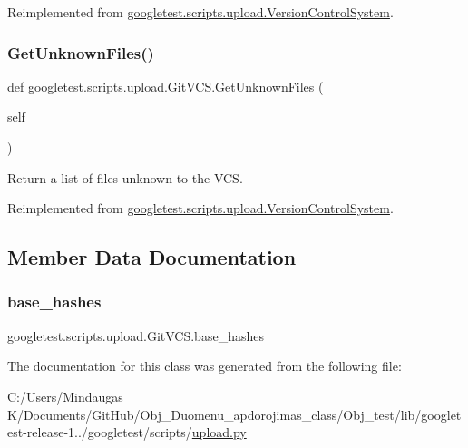 Reimplemented from \mbox{\hyperlink{classgoogletest_1_1scripts_1_1upload_1_1_version_control_system_af04094a3d55158ec8731c57af99eaf4c}{googletest.\+scripts.\+upload.\+Version\+Control\+System}}.

\mbox{\label{classgoogletest_1_1scripts_1_1upload_1_1_git_v_c_s_adbbe5f9ce57c362cc9e79e270c39ab54}} 
\subsubsection{\texorpdfstring{GetUnknownFiles()}{GetUnknownFiles()}}
{\footnotesize\ttfamily def googletest.\+scripts.\+upload.\+Git\+V\+C\+S.\+Get\+Unknown\+Files (\begin{DoxyParamCaption}\item[{}]{self }\end{DoxyParamCaption})}

\begin{DoxyVerb}Return a list of files unknown to the VCS.\end{DoxyVerb}
 

Reimplemented from \mbox{\hyperlink{classgoogletest_1_1scripts_1_1upload_1_1_version_control_system_a65c6bfa5a25cadeaa54866c6d3cf9da3}{googletest.\+scripts.\+upload.\+Version\+Control\+System}}.



\subsection{Member Data Documentation}
\mbox{\label{classgoogletest_1_1scripts_1_1upload_1_1_git_v_c_s_ab528f834b67a32ccb55b2ada00a166fa}} 
\subsubsection{\texorpdfstring{base\_hashes}{base\_hashes}}
{\footnotesize\ttfamily googletest.\+scripts.\+upload.\+Git\+V\+C\+S.\+base\+\_\+hashes}



The documentation for this class was generated from the following file\+:\begin{DoxyCompactItemize}
\item 
C\+:/\+Users/\+Mindaugas K/\+Documents/\+Git\+Hub/\+Obj\+\_\+\+Duomenu\+\_\+apdorojimas\+\_\+class/\+Obj\+\_\+test/lib/googletest-\/release-\/1../googletest/scripts/\mbox{\hyperlink{_obj__test_2lib_2googletest-release-1_88_81_2googletest_2scripts_2upload_8py}{upload.\+py}}\end{DoxyCompactItemize}

